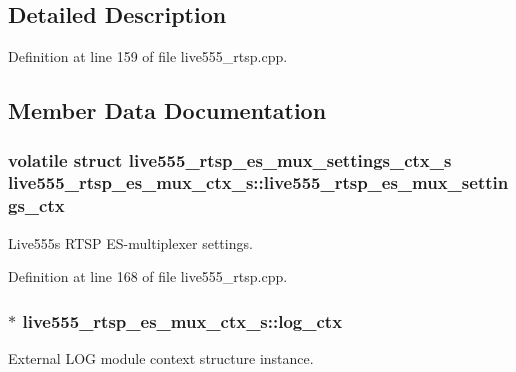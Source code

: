 \subsection{Detailed Description}


Definition at line 159 of file live555\+\_\+rtsp.\+cpp.



\subsection{Member Data Documentation}
\subsubsection[{\texorpdfstring{live555\+\_\+rtsp\+\_\+es\+\_\+mux\+\_\+settings\+\_\+ctx}{live555_rtsp_es_mux_settings_ctx}}]{\setlength{\rightskip}{0pt plus 5cm}volatile struct {\bf live555\+\_\+rtsp\+\_\+es\+\_\+mux\+\_\+settings\+\_\+ctx\+\_\+s} live555\+\_\+rtsp\+\_\+es\+\_\+mux\+\_\+ctx\+\_\+s\+::live555\+\_\+rtsp\+\_\+es\+\_\+mux\+\_\+settings\+\_\+ctx}\hypertarget{structlive555__rtsp__es__mux__ctx__s_aad4b5b5b7f6728e513332025cdb5ad84}{}\label{structlive555__rtsp__es__mux__ctx__s_aad4b5b5b7f6728e513332025cdb5ad84}
Live555\textquotesingle{}s R\+T\+SP E\+S-\/multiplexer settings. 

Definition at line 168 of file live555\+\_\+rtsp.\+cpp.

\subsubsection[{\texorpdfstring{log\+\_\+ctx}{log_ctx}}]{$\ast$ live555\+\_\+rtsp\+\_\+es\+\_\+mux\+\_\+ctx\+\_\+s\+::log\+\_\+ctx}\hypertarget{structlive555__rtsp__es__mux__ctx__s_a17b61ccf1a42eee4efba9cc593c99a5d}{}\label{structlive555__rtsp__es__mux__ctx__s_a17b61ccf1a42eee4efba9cc593c99a5d}
External L\+OG module context structure instance. 

